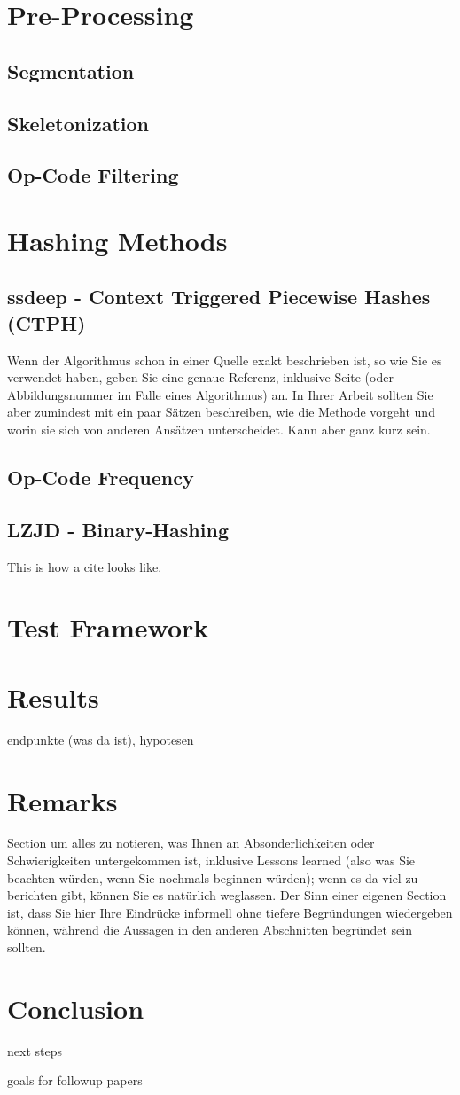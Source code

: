 \documentclass{article}
\begin{document}
\section{Pre-Processing}
\subsection{Segmentation}
\subsection{Skeletonization}
\subsection{Op-Code Filtering}

\section{Hashing Methods}
\subsection{ssdeep - Context Triggered Piecewise Hashes (CTPH)}
Wenn der Algorithmus schon in einer Quelle exakt beschrieben ist, so wie
Sie es verwendet haben, geben Sie eine genaue Referenz, inklusive Seite
(oder Abbildungsnummer im Falle eines Algorithmus) an. In Ihrer Arbeit
sollten Sie aber zumindest mit ein paar Sätzen beschreiben, wie die
Methode vorgeht und worin sie sich von anderen Ansätzen unterscheidet.
Kann aber ganz kurz sein.

\subsection{Op-Code Frequency}
\subsection{LZJD - Binary-Hashing}
This is how a cite\cite{sung2004static} looks like.

\section{Test Framework}
\section{Results}
endpunkte (was da ist), hypotesen

\section{Remarks}
Section um alles zu notieren, was Ihnen an Absonderlichkeiten oder Schwierigkeiten untergekommen
ist, inklusive Lessons learned (also was Sie beachten würden, wenn Sie nochmals
beginnen würden); wenn es da viel zu berichten gibt, können Sie es
natürlich weglassen. Der Sinn einer eigenen Section ist, dass Sie hier
Ihre Eindrücke informell ohne tiefere Begründungen wiedergeben können,
während die Aussagen in den anderen Abschnitten begründet sein sollten.

\section{Conclusion}

next steps

goals for followup papers

\printbibliography
\end{document}
